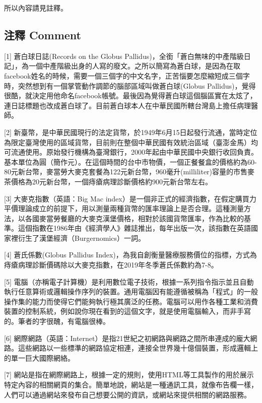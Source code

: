 \documentclass[a5paper, 12pt
]{book}
\begin{document}
所以內容請見註釋。

\hypertarget{ux6ce8ux91cb-comment}{%
\subsection{注釋 Comment}\label{ux6ce8ux91cb-comment}}

{[}1{]} 蒼白球日誌(Records on the Globus
Pallidus)，全銜「蒼白無味的中產階級日記」，為一個中產階級出身的人寫的廢文。之所以簡寫為蒼白球，是因為在取facebook姓名的時候，需要一個三個字的中文名字，正苦惱要怎麼縮短成三個字時，突然想到有一個掌管動作調節的腦部區域叫做蒼白球(Globus
Pallidus)，覺得很酷，就決定用他命名facebook帳號。最後因為覺得蒼白球這個腦區實在太炫了，連日誌標題也改成蒼白球了。目前蒼白球本人在中華民國所轄台灣島上擔任病理醫師。

{[}2{]}
新臺幣，是中華民國現行的法定貨幣，於1949年6月15日起發行流通，當時定位為限定臺灣使用的區域貨幣，目前則在整個中華民國有效統治區域（臺澎金馬）均可流通使用。原始發行機構為臺灣銀行，2000年起由中華民國中央銀行收回負責。基本單位為圓（簡作元）。在這個時間的台中市物價，一個正餐餐盒的價格約為60-80元新台幣，麥當勞大麥克套餐為122元新台幣，960毫升(milliliter)容量的市售麥茶價格為20元新台幣，一個痔瘡病理診斷價格約900元新台幣左右。

{[}3{]} 大麥克指數（英語：Big Mac
index）是一個非正式的經濟指數，在假定購買力平價理論成立的前提下，用以測量兩種貨幣的匯率理論上是否合理。這種測量方法，以各國麥當勞餐廳的大麥克漢堡價格，相對於該國貨幣匯率，作為比較的基準。這個指數在1986年由《經濟學人》雜誌推出，每年出版一次，該指數在英語國家裡衍生了漢堡經濟（Burgernomics）一詞。

{[}4{]} 蒼氏係數(Globus Pallidus
Index)，為我自創衡量醫療服務價位的指標，方式為痔瘡病理診斷價碼除以大麥克指數，在2019年冬季蒼氏係數約為7-8。

{[}5{]}
電腦（亦稱電子計算機）是利用數位電子技術，根據一系列指令指示並且自動執行任意算術或邏輯操作序列的裝置。通用電腦因有能遵循被稱為「程式」的一般操作集的能力而使得它們能夠執行極其廣泛的任務。電腦可以用作各種工業和消費裝置的控制系統，例如說你現在看到的這個文字，就是使用電腦輸入，而非手寫的。筆者的字很醜，有電腦很棒。

{[}6{]}
網際網路（英語：Internet）是指21世紀之初網路與網路之間所串連成的龐大網路。這些網路以一些標準的網路協定相連，連接全世界幾十億個裝置，形成邏輯上的單一巨大國際網絡。

{[}7{]}
網站是指在網際網路上，根據一定的規則，使用HTML等工具製作的用於展示特定內容的相關網頁的集合。簡單地說，網站是一種通訊工具，就像布告欄一樣，人們可以通過網站來發布自己想要公開的資訊，或網站來提供相關的網路服務。
\end{document}
